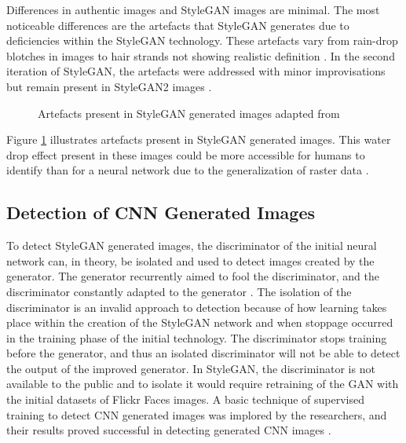 Differences in authentic images and StyleGAN images are minimal. The most noticeable differences are the artefacts that StyleGAN generates due to deficiencies within the StyleGAN technology. These artefacts vary from rain-drop blotches in images to hair strands not showing realistic definition \citep{Karras2020}. In the second iteration of StyleGAN, the artefacts were addressed with minor improvisations but remain present in StyleGAN2 images \citep{Karras2020}.

\begin{figure}[!htbp!]%
\centering
{}%
\caption{Artefacts present in StyleGAN generated images adapted from \cite{Karras2020}}%
\label{fig:8}%
\end{figure}

Figure \ref{fig:8} illustrates artefacts present in StyleGAN generated images. This water drop effect present in these images could be more accessible for humans to identify than for a neural network due to the generalization of raster data \citep{Karras2020}.

\subsection{Detection of CNN Generated Images}

To detect StyleGAN generated images, the discriminator of the initial neural network can, in theory, be isolated and used to detect images created by the generator. The generator recurrently aimed to fool the discriminator, and the discriminator constantly adapted to the generator \citep{Karras2020}. The isolation of the discriminator is an invalid approach to detection because of how learning takes place within the creation of the StyleGAN network and when stoppage occurred in the training phase of the initial technology. The discriminator stops training before the generator, and thus an isolated discriminator will not be able to detect the output of the improved generator. In StyleGAN, the discriminator is not available to the public and to isolate it would require retraining of the GAN with the initial datasets of Flickr Faces images. A basic technique of supervised training to detect CNN generated images was implored by the researchers, and their results proved successful in detecting generated CNN images \citep{Wang}.


